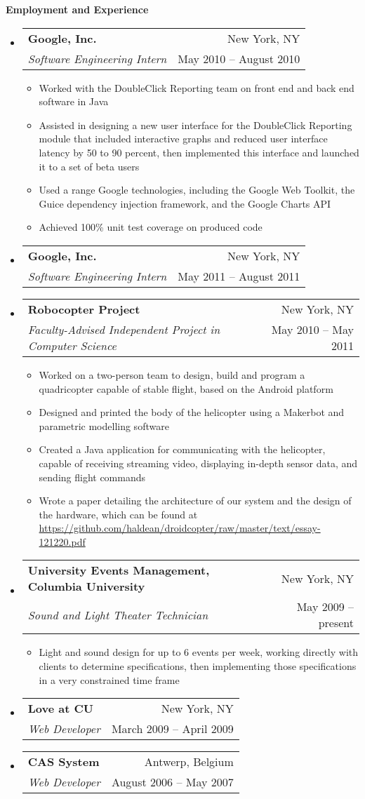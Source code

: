 \documentclass[letterpaper,11pt]{article}
\makeatletter
\newcommand{\resitem}[1]{\item #1 \vspace{-2pt}}
\newcommand{\resheading}[1]{{\vspace{16pt}\large
    \colorbox{heading_color}{\begin{minipage}{\textwidth}{\textbf{ #1
            \vphantom{p\^{E}}}}\end{minipage}}}}
\newcommand{\ressubheading}[5]{
\item\begin{tabular*}{6.4in}{l@{\extracolsep{\fill}}r}
    \textbf{#1} & #2 \\
    \textit{#3} & #4 \\
  \end{tabular*}\vspace{-6pt}
  {\footnotesize \begin{itemize} #5 \end{itemize}}\vspace{6pt}}
\newcommand{\ressubheadingnoitems}[4]{
\item\begin{tabular*}{6.4in}{l@{\extracolsep{\fill}}r}
    \textbf{#1} & #2 \\
    \textit{#3} & #4 \\
  \end{tabular*}\vspace{6pt}}
\newcommand{\linkto}[1]{\href{#1}{#1}}
\makeatother
\begin{document}
\resheading{Employment and Experience}
\begin{itemize}
  \ressubheading{Google, Inc.}{New York, NY}{Software Engineering
    Intern}{May 2010 -- August 2010}{
    \resitem{Worked with the DoubleClick Reporting team on front end
      and back end software in Java}

    \resitem{Assisted in designing a new user interface for the
      DoubleClick Reporting module that included interactive graphs
      and reduced user interface latency by 50 to 90 percent, then
      implemented this interface and launched it to a set of beta
      users}

    \resitem{Used a range Google technologies, including the Google
      Web Toolkit, the Guice dependency injection framework, and the
      Google Charts API}

    \resitem{Achieved 100\% unit test coverage on produced code}}

  \ressubheadingnoitems{Google, Inc.}{New York, NY}{Software
    Engineering Intern}{May 2011 -- August 2011}

  \ressubheading{Robocopter Project}{New York, NY}{Faculty-Advised
    Independent Project in Computer Science}{May 2010 -- May 2011}{
    \resitem{Worked on a two-person team to design, build and
      program a quadricopter capable of stable flight, based on the
      Android platform}

    \resitem{Designed and printed the body of the helicopter using a
      Makerbot and parametric modelling software}

    \resitem{Created a Java application for communicating with the
      helicopter, capable of receiving streaming video, displaying
      in-depth sensor data, and sending flight commands}

    \resitem{Wrote a paper detailing the architecture of our system
      and the design of the hardware, which can be found at
      \linkto{https://github.com/haldean/droidcopter/raw/master/text/essay-121220.pdf}}}

  \ressubheading{University Events Management, Columbia
    University}{New York, NY}{Sound and Light Theater Technician}{May
    2009 -- present}{

    \resitem{Light and sound design for up to 6 events per week,
      working directly with clients to determine specifications, then
      implementing those specifications in a very constrained time
      frame}}

  \ressubheadingnoitems{Love at CU}{New York, NY}{Web Developer}{March
    2009 -- April 2009}

  \ressubheadingnoitems{CAS System}{Antwerp, Belgium}{Web
    Developer}{August 2006 -- May 2007}
\end{itemize}  %
\end{document}
